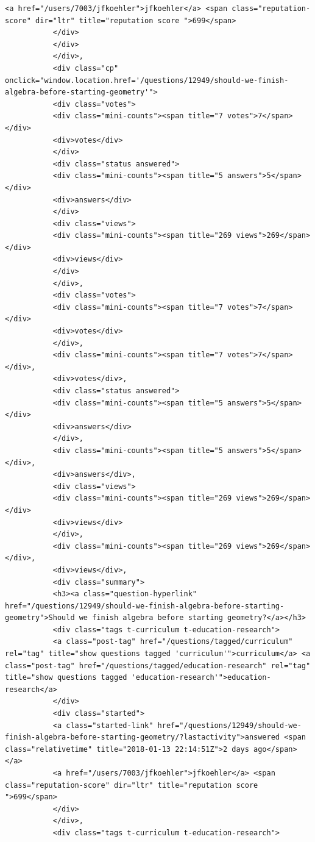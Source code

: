 \documentclass[11pt]{article}
\begin{document}
\begin{Verbatim}[commandchars=\\\{\}]
           <a href="/users/7003/jfkoehler">jfkoehler</a> <span class="reputation-score" dir="ltr" title="reputation score ">699</span>
           </div>
           </div>
           </div>,
           <div class="cp" onclick="window.location.href='/questions/12949/should-we-finish-algebra-before-starting-geometry'">
           <div class="votes">
           <div class="mini-counts"><span title="7 votes">7</span></div>
           <div>votes</div>
           </div>
           <div class="status answered">
           <div class="mini-counts"><span title="5 answers">5</span></div>
           <div>answers</div>
           </div>
           <div class="views">
           <div class="mini-counts"><span title="269 views">269</span></div>
           <div>views</div>
           </div>
           </div>,
           <div class="votes">
           <div class="mini-counts"><span title="7 votes">7</span></div>
           <div>votes</div>
           </div>,
           <div class="mini-counts"><span title="7 votes">7</span></div>,
           <div>votes</div>,
           <div class="status answered">
           <div class="mini-counts"><span title="5 answers">5</span></div>
           <div>answers</div>
           </div>,
           <div class="mini-counts"><span title="5 answers">5</span></div>,
           <div>answers</div>,
           <div class="views">
           <div class="mini-counts"><span title="269 views">269</span></div>
           <div>views</div>
           </div>,
           <div class="mini-counts"><span title="269 views">269</span></div>,
           <div>views</div>,
           <div class="summary">
           <h3><a class="question-hyperlink" href="/questions/12949/should-we-finish-algebra-before-starting-geometry">Should we finish algebra before starting geometry?</a></h3>
           <div class="tags t-curriculum t-education-research">
           <a class="post-tag" href="/questions/tagged/curriculum" rel="tag" title="show questions tagged 'curriculum'">curriculum</a> <a class="post-tag" href="/questions/tagged/education-research" rel="tag" title="show questions tagged 'education-research'">education-research</a>
           </div>
           <div class="started">
           <a class="started-link" href="/questions/12949/should-we-finish-algebra-before-starting-geometry/?lastactivity">answered <span class="relativetime" title="2018-01-13 22:14:51Z">2 days ago</span></a>
           <a href="/users/7003/jfkoehler">jfkoehler</a> <span class="reputation-score" dir="ltr" title="reputation score ">699</span>
           </div>
           </div>,
           <div class="tags t-curriculum t-education-research">

\end{Verbatim}
\end{document}
